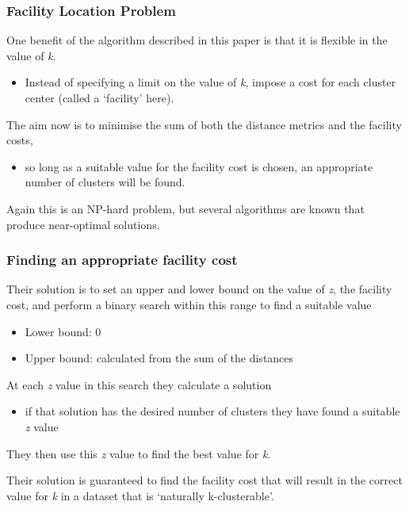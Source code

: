 \documentclass{beamer}
\begin{document}
\frame
    {
      \frametitle{Facility Location Problem}

      One benefit of the algorithm described in this paper is that it is
      flexible in the value of {\em k}.
      \begin{itemize}
      \item Instead of specifying a limit on the value of {\em k}, impose
        a cost for each cluster center (called a `facility' here).
      \end{itemize}

      \bigskip
      The aim now is to minimise the sum of both the distance metrics and
      the facility costs,
      \begin{itemize}
      \item so long as a suitable value for the facility cost is
        chosen, an appropriate number of clusters will be found.
      \end{itemize}

      \bigskip
      Again this is an NP-hard problem, but several algorithms are
      known that produce near-optimal solutions.
      
    }

\frame
    {
      \frametitle{Finding an appropriate facility cost}

      Their solution is to set an upper and lower bound on the value of {\em z},
      the facility cost, and perform a binary search within this range to
      find a suitable value
      \begin{itemize}
      \item Lower bound: 0
      \item Upper bound: calculated from the sum of the distances
      \end{itemize}

      \bigskip
      At each {\em z} value in this search they calculate a solution
      \begin{itemize}
      \item if that solution has the desired number of clusters they
        have found a suitable {\em z} value
      \end{itemize}
      They then use this {\em z} value to find the best value for {\em k}.

      \bigskip
      Their solution is guaranteed to find the facility cost that will
      result in the correct value for {\em k} in a dataset that is
      `naturally k-clusterable'.

      
    }
\end{document}
